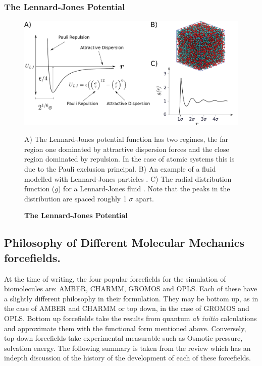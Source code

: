 \subsubsection{The Lennard-Jones Potential}
\begin{figure}
	\begin{center}
		\includegraphics[width=\textwidth]{figures/LJ_figure.pdf}
	\end{center}
	\captionsetup{singlelinecheck = false, justification=raggedright}
	\caption[The Lennard-Jones Potential] {\textbf{The Lennard-Jones Potential}}{A) The Lennard-Jones potential function has two regimes, the far region one dominated by attractive dispersion forces and the close region dominated by repulsion. In the case of atomic systems this is due to the Pauli exclusion principal. B) An example of a fluid modelled with Lennard-Jones particles \cite{chari2019}. C) The radial distribution function ($g$) for a Lennard-Jones fluid \cite{morsali2005}. Note that the peaks in the distribution are spaced roughly 1 $\sigma$ apart. }
	\label{Lennard-Jones_figure}
\end{figure}

\subsection{Philosophy of Different Molecular Mechanics forcefields.}
At the time of writing, the four popular forcefields for the simulation of biomolecules are: AMBER, CHARMM, GROMOS and OPLS. Each of these have a slightly different philosophy in their formulation. They may be bottom up, as in the case of AMBER and CHARMM or top down, in the case of GROMOS and OPLS. Bottom up forcefields take the results from quantum \textit{ab initio} calculations and approximate them with the functional form mentioned above. Conversely, top down forcefields take experimental measurable such as Osmotic pressure, solvation energy. The following summary is taken from the review \cite{lemkul2020} which has an indepth discussion of the history of the development of each of these forcefields.

